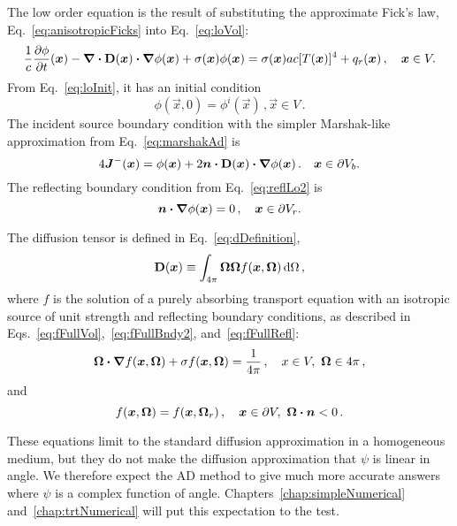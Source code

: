 The low order equation is the result of substituting the approximate Fick's law,
Eq.~\eqref{eq:anisotropicFicks} into Eq.~\eqref{eq:loVol}:
\begin{equation*}
\frac{1}{c} \frac{\partial \phi}{\partial t} (\bm{x})
  - \bm{\nabla} \bm{\cdot} \mathbf{D}(\bm{x}) \bm{\cdot} \bm{\nabla} \phi(\bm{x})
  + \sigma(\bm{x}) \phi(\bm{x})
  = \sigma(\bm{x}) ac [T(\bm{x})]^4 + q_{r}(\bm{x}) \,,
  \quad \bm{x} \in V.
\end{equation*}
From Eq.~\eqref{eq:loInit}, it has an initial condition
\begin{equation*}
\phi(\vec{x}, 0) = \phi^i(\vec{x})\,, \vec{x} \in V  \,.
\end{equation*}
The incident source boundary condition with the simpler Marshak-like
approximation from Eq.~\eqref{eq:marshakAd} is
\begin{equation*}
  4 \bm{J}^-(\bm{x})
  = \phi(\bm{x})
  + 2 \bm{n} \bm{\cdot} \mathbf{D}(\bm{x}) \bm{\cdot} \bm{\nabla} \phi(\bm{x}) \,.
 \quad \bm{x} \in \partial V_b.
\end{equation*}
The reflecting boundary condition from Eq.~\eqref{eq:reflLo2} is
\begin{equation*}
  \bm{n}\bm{\cdot}\bm{\nabla} \phi(\bm{x}) = 0 \,,
 \quad \bm{x} \in \partial V_r.
\end{equation*}

The diffusion tensor is defined in Eq.~\eqref{eq:dDefinition},
\begin{equation*}
  \mathbf{D}(\bm{x}) \equiv \int_{4\pi} \bm{\Omega} \bm{\Omega}
  f(\bm{x}, \bm{\Omega}) \mathop{}\!\mathrm{d}\Omega \,,
\end{equation*}
where $f$ is the solution of a purely absorbing transport equation with an
isotropic source of unit strength and reflecting boundary conditions, as
described in Eqs.~\eqref{eq:fFullVol},~\eqref{eq:fFullBndy2}, and~\eqref{eq:fFullRefl}:
\begin{equation*}
    \bm{\Omega}\bm{\cdot} \bm{\nabla} f(\bm{x}, \bm{\Omega})
    + \sigma f (\bm{x}, \bm{\Omega})
  = \frac{1}{4\pi} \,, \quad x \in V,\ \bm{\Omega} \in 4\pi\,,
\end{equation*}
and
\begin{equation*}
  f(\bm{x}, \bm{\Omega}) = f(\bm{x}, \bm{\Omega}_r) \,,
 \quad \bm{x} \in \partial V, \ \bm{\Omega} \bm{\cdot} \bm{n} < 0\,.
\end{equation*}

These equations limit to the standard diffusion approximation in a homogeneous
medium, but they do not make the diffusion approximation that $\psi$ is linear in
angle. We therefore expect the AD method to give much more accurate answers
where $\psi$ is a complex function of angle. Chapters~\ref{chap:simpleNumerical}
and~\ref{chap:trtNumerical} will put this expectation to the test.

